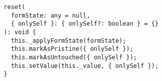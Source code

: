 \begin{verbatim}
  reset(
    formState: any = null,
    { onlySelf }: { onlySelf?: boolean } = {}
  ): void {
    this._applyFormState(formState);
    this.markAsPristine({ onlySelf });
    this.markAsUntouched({ onlySelf });
    this.setValue(this._value, { onlySelf });
  }
\end{verbatim}
